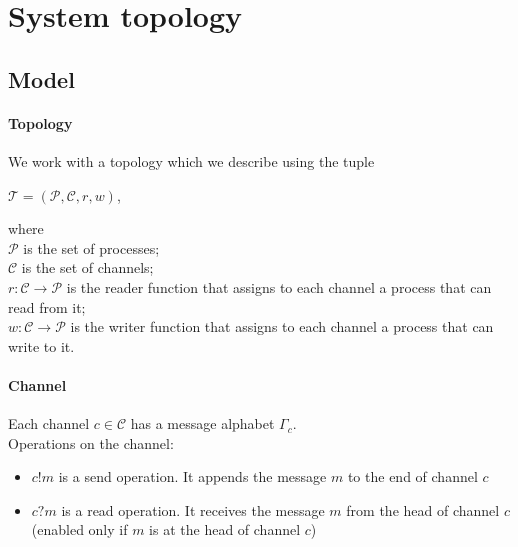 \documentclass[a4paper,UKenglish,cleveref, autoref, thm-restate]{lipics-v2019}
\begin{document}






\section{System topology}

\subsection{Model}


\paragraph*{Topology}
We work with a topology which we describe using the tuple 
\begin{center}
$\mathcal{T}= (\mathcal{P}, \mathcal{C}, r, w)$,
\end{center}
where \\
\hspace*{1cm} $\mathcal{P}$ is the set of processes; \\
\hspace*{1cm} $\mathcal{C}$ is the set of channels; \\
\hspace*{1cm} $r:\mathcal{C}  \rightarrow \mathcal{P}$ is the reader function that assigns to each channel a process that can read from it;\\
\hspace*{1cm} $w:\mathcal{C} \rightarrow \mathcal{P}$ is the writer function that assigns to each channel a process that can write to it.


\paragraph*{Channel}

Each channel $c \in \mathcal{C}$ has a message alphabet $\Gamma_c$.\\
Operations on the channel: 
\begin{itemize}
\item $c!m$ is a send operation. It appends the message $m$ to the end of channel $c$
\item $c?m$ is a read operation. It receives the message $m$ from the head of channel $c$ (enabled only if $m$ is at the head of channel $c$)

\end{itemize}
\end{document}
